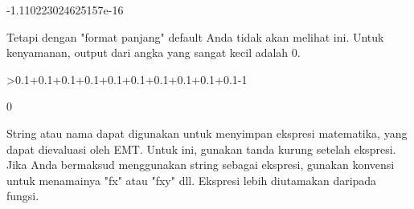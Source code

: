\documentclass[a4paper,10pt]{article}
\begin{document}
\begin{eulernotebook}
\begin{euleroutput}
   -1.110223024625157e-16 
\end{euleroutput}
\begin{eulercomment}
Tetapi dengan "format panjang" default Anda tidak akan melihat ini.
Untuk kenyamanan, output dari angka yang sangat kecil adalah 0.
\end{eulercomment}
\begin{eulerprompt}
>0.1+0.1+0.1+0.1+0.1+0.1+0.1+0.1+0.1+0.1-1
\end{eulerprompt}
\begin{euleroutput}
  0
\end{euleroutput}
\begin{eulercomment}
String atau nama dapat digunakan untuk menyimpan ekspresi matematika,
yang dapat dievaluasi oleh EMT. Untuk ini, gunakan tanda kurung
setelah ekspresi. Jika Anda bermaksud menggunakan string sebagai
ekspresi, gunakan konvensi untuk menamainya "fx" atau "fxy" dll.
Ekspresi lebih diutamakan daripada fungsi.


\end{eulercomment}
\end{eulernotebook}
\end{document}
